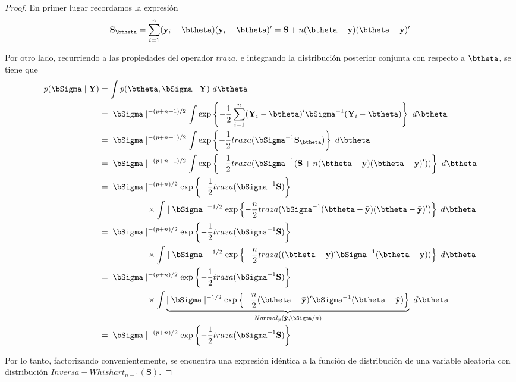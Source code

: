 \documentclass[10pt,openright]{book}\usepackage[]{graphicx}\usepackage[]{color}
\begin{document}
\begin{proof}
En primer lugar recordamos la expresi\'on 
\begin{equation*}
\textbf{S}_{\btheta}=\sum_{i=1}^n(\mathbf{y}_i-\btheta)(\mathbf{y}_i-\btheta)'=\mathbf{S}+n(\btheta-\bar{\mathbf{y}})(\btheta-\bar{\mathbf{y}})'
\end{equation*}


Por otro lado, recurriendo a las propiedades del operador $traza$, e integrando la distribuci\'on posterior conjunta con respecto a $\btheta$, se tiene que
\begin{align*}
p(\bSigma \mid \mathbf{Y})&=\int p(\btheta,\bSigma \mid \mathbf{Y}) \ d\btheta\\
&= \mid \bSigma \mid ^{-(p+n+1)/2}\int\exp\left\{ -\frac{1}{2}\sum_{i=1}^n
  (\mathbf{Y}_i-\btheta)'\bSigma^{-1}(\mathbf{Y}_i-\btheta)\right\} \ d\btheta\\
  &= \mid \bSigma \mid ^{-(p+n+1)/2}\int
  \exp\left\{ -\frac{1}{2}traza(\bSigma^{-1}\mathbf{S}_{\btheta})\right\} \ d\btheta\\
  &= \mid \bSigma \mid ^{-(p+n+1)/2}\int
  \exp\left\{ -\frac{1}{2}traza(\bSigma^{-1}
  (\mathbf{S}+n(\btheta-\bar{\mathbf{y}})(\btheta-\bar{\mathbf{y}})'))\right\} \ d\btheta\\
&= \mid \bSigma \mid ^{-(p+n)/2}\exp\left\{ -\frac{1}{2}traza(\bSigma^{-1}\mathbf{S})\right\}\\
&\hspace{2cm}\times
\int \mid \bSigma \mid ^{-1/2}\exp\left\{ -\frac{n}{2}traza(\bSigma^{-1}(\btheta-\bar{\mathbf{y}})(\btheta-\bar{\mathbf{y}})')\right\} \ d\btheta\\
&= \mid \bSigma \mid ^{-(p+n)/2}\exp\left\{ -\frac{1}{2}traza(\bSigma^{-1}\mathbf{S})\right\}\\
&\hspace{2cm}\times\int \mid \bSigma \mid ^{-1/2}\exp\left\{ -\frac{n}{2}traza((\btheta-\bar{\mathbf{y}})'\bSigma^{-1}(\btheta-\bar{\mathbf{y}}))\right\} \ d\btheta\\
&= \mid \bSigma \mid ^{-(p+n)/2}\exp\left\{ -\frac{1}{2}traza(\bSigma^{-1}\mathbf{S})\right\}\\
&\hspace{2cm}\times
\int\underbrace{ \mid \bSigma \mid ^{-1/2}\exp\left\{ -\frac{n}{2}(\btheta-\bar{\mathbf{y}})'\bSigma^{-1}(\btheta-\bar{\mathbf{y}})\right\}}_{Normal_p(\bar{\mathbf{y}},\bSigma/n)} \ d\btheta\\
&= \mid \bSigma \mid ^{-(p+n)/2}\exp\left\{ -\frac{1}{2}traza(\bSigma^{-1}\mathbf{S})\right\}
\end{align*}

Por lo tanto, factorizando convenientemente, se encuentra una expresi\'on id\'entica a la funci\'on de distribuci\'on de una variable aleatoria con distribuci\'on $Inversa-Whishart_{n-1}(\mathbf{S})$.
\end{proof}
\end{document}
